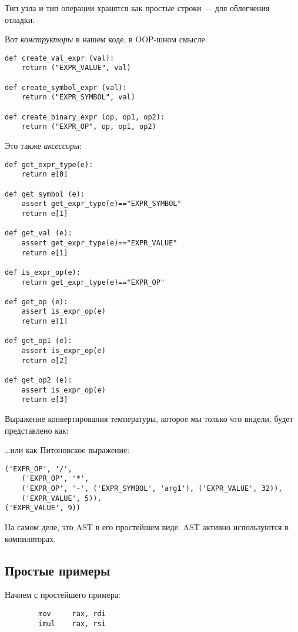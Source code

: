 Тип узла и тип операции хранятся как простые строки --- для облегчения отладки.

Вот \textit{конструкторы} в нашем коде, в \ac{OOP}-шном смысле.

\begin{lstlisting}
def create_val_expr (val):
    return ("EXPR_VALUE", val)

def create_symbol_expr (val):
    return ("EXPR_SYMBOL", val)

def create_binary_expr (op, op1, op2):
    return ("EXPR_OP", op, op1, op2)
\end{lstlisting}

Это также \textit{аксессоры}:

\begin{lstlisting}
def get_expr_type(e):
    return e[0]

def get_symbol (e):
    assert get_expr_type(e)=="EXPR_SYMBOL"
    return e[1]

def get_val (e):
    assert get_expr_type(e)=="EXPR_VALUE"
    return e[1]

def is_expr_op(e):
    return get_expr_type(e)=="EXPR_OP"

def get_op (e):
    assert is_expr_op(e)
    return e[1]

def get_op1 (e):
    assert is_expr_op(e)
    return e[2]

def get_op2 (e):
    assert is_expr_op(e)
    return e[3]
\end{lstlisting}

Выражение конвертирования температуры, которое мы только что видели, будет представлено как:



\dots или как Питоновское выражение:

\begin{lstlisting}
('EXPR_OP', '/', 
	('EXPR_OP', '*',
	('EXPR_OP', '-', ('EXPR_SYMBOL', 'arg1'), ('EXPR_VALUE', 32)), 
	('EXPR_VALUE', 5)), 
('EXPR_VALUE', 9))
\end{lstlisting}

На самом деле, это \ac{AST} в его простейшем виде.
\ac{AST} активно используются в компиляторах.

\subsection{Простые примеры}

Начнем с простейшего примера:

\begin{lstlisting}
        mov     rax, rdi
        imul    rax, rsi
\end{lstlisting}

